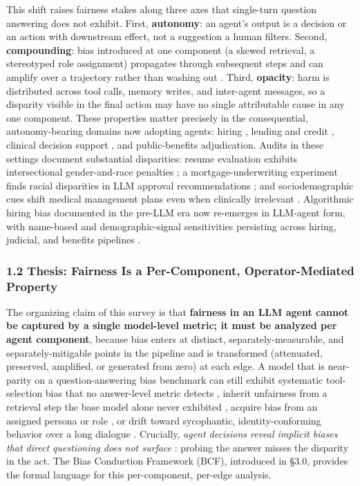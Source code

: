 \documentclass[10pt]{article}
\begin{document}
This shift raises fairness stakes along three axes that single-turn question answering does not exhibit. First, \textbf{autonomy}: an agent's output is a decision or an action with downstream effect, not a suggestion a human filters. Second, \textbf{compounding}: bias introduced at one component (a skewed retrieval, a stereotyped role assignment) propagates through subsequent steps and can amplify over a trajectory rather than washing out \cite{ma2026implicit,nguyen2025social}. Third, \textbf{opacity}: harm is distributed across tool calls, memory writes, and inter-agent messages, so a disparity visible in the final action may have no single attributable cause in any one component. These properties matter precisely in the consequential, autonomy-bearing domains now adopting agents: hiring \cite{an2025measuring,veldanda2023emily,nghiem2024you}, lending and credit \cite{bowen2024measuring,feng2023empowering,azime2025accept}, clinical decision support \cite{omar2025sociodemographic,zack2024coding,poulain2024bias}, and public-benefits adjudication. Audits in these settings document substantial disparities: resume evaluation exhibits intersectional gender-and-race penalties \cite{an2025measuring}; a mortgage-underwriting experiment finds racial disparities in LLM approval recommendations \cite{bowen2024measuring}; and sociodemographic cues shift medical management plans even when clinically irrelevant \cite{omar2025sociodemographic}. Algorithmic hiring bias documented in the pre-LLM era \cite{raghavan2020mitigating} now re-emerges in LLM-agent form, with name-based and demographic-signal sensitivities persisting across hiring, judicial, and benefits pipelines \cite{veldanda2023emily,basu2026names,hu2025llms}.

\subsubsection*{1.2 Thesis: Fairness Is a Per-Component, Operator-Mediated Property}

The organizing claim of this survey is that \textbf{fairness in an LLM agent cannot be captured by a single model-level metric; it must be analyzed per agent component}, because bias enters at distinct, separately-measurable, and separately-mitigable points in the pipeline and is transformed (attenuated, preserved, amplified, or generated from zero) at each edge. A model that is near-parity on a question-answering bias benchmark can still exhibit systematic tool-selection bias that no answer-level metric detects \cite{blankenstein2025biasbusters}, inherit unfairness from a retrieval step the base model alone never exhibited \cite{wu2024rag,hu2024free}, acquire bias from an assigned persona or role \cite{gupta2023bias,cao2026from}, or drift toward sycophantic, identity-conforming behavior over a long dialogue \cite{liu2025truth,ma2026implicit}. Crucially, \emph{agent decisions reveal implicit biases that direct questioning does not surface} \cite{li2025actions}: probing the answer misses the disparity in the act. The Bias Conduction Framework (BCF), introduced in \S{}3.0, provides the formal language for this per-component, per-edge analysis.
\end{document}
